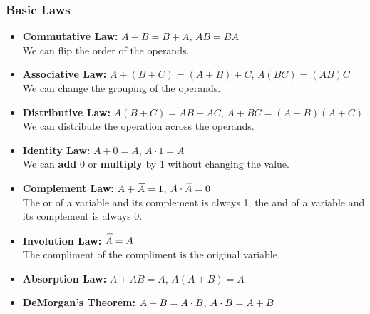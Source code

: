 \documentclass[12pt]{article}
\newcommand{\closure}[2][3]{%
	{}\mkern#1mu\overline{\mkern-#1mu#2}}
\begin{document}
\subsubsection{Basic Laws}
\begin{itemize}
	\item \textbf{Commutative Law:} \(A + B = B + A\), \(AB = BA\)\\
	      We can flip the order of the operands.
	\item \textbf{Associative Law:} \(A + (B + C) = (A + B) + C\), \(A(BC) = (AB)C\)\\
	      We can change the grouping of the operands.
	\item \textbf{Distributive Law:} \(A(B + C) = AB + AC\), \(A + BC = (A + B)(A + C)\)\\
	      We can distribute the operation across the operands.
	\item \textbf{Identity Law:} \(A + 0 = A\), \(A \cdot 1 = A\)\\
	      We can \textbf{add} 0 or \textbf{multiply} by 1 without changing the value.
	\item \textbf{Complement Law:} \(A + \closure{A} = 1\), \(A \cdot \closure{A} = 0\)\\
	      The or of a variable and its complement is always 1, the and of a variable and its complement is always 0.
	\item \textbf{Involution Law:} \(\closure{\closure{A}} = A\)\\
	      The compliment of the compliment is the original variable.
	\item \textbf{Absorption Law:} \(A + AB = A\), \(A(A + B) = A\)
	\item \textbf{DeMorgan's Theorem:} \(\closure{A + B} = \closure{A} \cdot \closure{B}\), \(\closure{A \cdot B} = \closure{A} + \closure{B}\)
\end{itemize}
\end{document}
